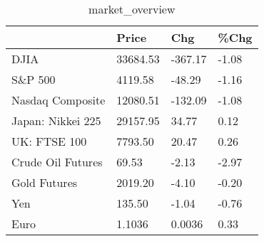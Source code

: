 \documentclass{article}%
\begin{document}
%


\begin{table}[htbp]%
\caption{market\_overview}%
\centering%
\begin{adjustbox}{width=1\textwidth}%
\begin{tabular}{llll}
\toprule
                  &    Price &     Chg &  \%Chg \\
\midrule
             DJIA & 33684.53 & -367.17 & -1.08 \\
          S\&P 500 &  4119.58 &  -48.29 & -1.16 \\
 Nasdaq Composite & 12080.51 & -132.09 & -1.08 \\
Japan: Nikkei 225 & 29157.95 &   34.77 &  0.12 \\
     UK: FTSE 100 &  7793.50 &   20.47 &  0.26 \\
Crude Oil Futures &    69.53 &   -2.13 & -2.97 \\
     Gold Futures &  2019.20 &   -4.10 & -0.20 \\
              Yen &   135.50 &   -1.04 & -0.76 \\
             Euro &   1.1036 &  0.0036 &  0.33 \\
\bottomrule
\end{tabular}
%
\end{adjustbox}%
\end{table}

%
\end{document}
